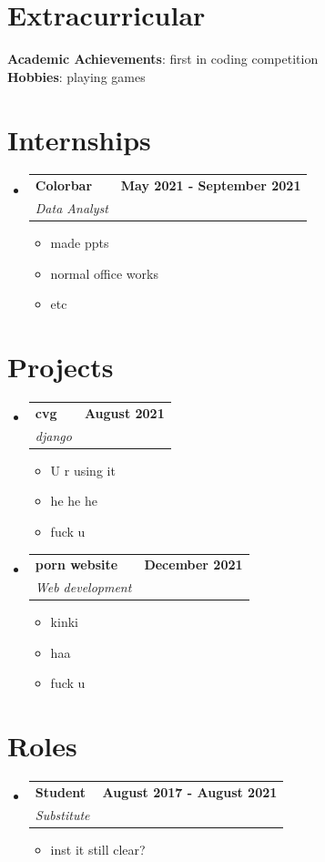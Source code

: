\documentclass[letterpaper,11pt]{article}
\makeatletter
\newcommand{\resumeItem}[1]{
  \item\small{
    {#1 \vspace{-2pt}}
  }
}
\newcommand{\resumeSubheading}[4]{
  \vspace{-2pt}\item
    \begin{tabular*}{1.0\textwidth}[t]{l@{\extracolsep{\fill}}r}
      \textbf{#1} & \textbf{\small #2} \\
      \textit{\small#3} & \textit{\small #4} \\
    \end{tabular*}\vspace{-7pt}
}
\newcommand{\resumeSubHeadingListStart}{\begin{itemize}[leftmargin=0.0in, label={}]}
\newcommand{\resumeSubHeadingListEnd}{\end{itemize}}
\newcommand{\resumeItemListStart}{\begin{itemize}}
\newcommand{\resumeItemListEnd}{\end{itemize}\vspace{-5pt}}
\makeatother
\begin{document}
\section{Extracurricular}
 \begin{itemize}[leftmargin=0.15in, label={}]
    \small{\item{
     \textbf{Academic Achievements}{: first in coding competition } \\
     \textbf{Hobbies}{: playing games } \\
     
    }}
 \end{itemize}
 \vspace{-16pt}
\section{Internships}    %
    \resumeSubHeadingListStart
      \resumeSubheading
      { Colorbar }{ May 2021 - September 2021 }
      { Data Analyst }{}
      \resumeItemListStart
        \resumeItem{made ppts
}	\resumeItem{normal office works
}	\resumeItem{etc}	
      \resumeItemListEnd
    \resumeSubHeadingListEnd

\section{Projects}    %
    \resumeSubHeadingListStart
      \resumeSubheading
      { cvg }{ August 2021 }
      { django }{}
      \resumeItemListStart
        \resumeItem{U r using it
}	\resumeItem{he he he
}	\resumeItem{fuck u}	
      \resumeItemListEnd
    \resumeSubHeadingListEnd
    \resumeSubHeadingListStart
      \resumeSubheading
      { porn website }{ December 2021 }
      { Web development }{}
      \resumeItemListStart
        \resumeItem{kinki 
}	\resumeItem{haa
}	\resumeItem{fuck u}	
      \resumeItemListEnd
    \resumeSubHeadingListEnd

\section{Roles}    %
    \resumeSubHeadingListStart
      \resumeSubheading
      { Student }{ August 2017 - August 2021 }
      { Substitute }{}
      \resumeItemListStart
        \resumeItem{inst it still clear?}	
      \resumeItemListEnd
    \resumeSubHeadingListEnd
\end{document}
